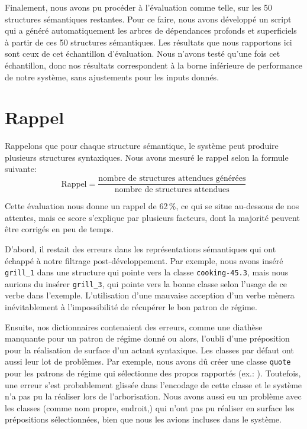 Finalement, nous avons pu procéder à l'évaluation comme telle, sur les 50 structures sémantiques restantes. Pour ce faire, nous avons développé un script qui a généré automatiquement les arbres de dépendances profonds et superficiels à partir de ces 50 structures sémantiques. Les résultats que nous rapportons ici sont ceux de cet échantillon d'évaluation. Nous n'avons testé qu'une fois cet échantillon, donc nos résultats correspondent à la borne inférieure de performance de notre système, sans ajustements pour les inputs donnés.
                              
\section{Rappel}

Rappelons que pour chaque structure sémantique, le système peut produire plusieurs structures syntaxiques. Nous avons mesuré le rappel selon la formule suivante:
\[\text{Rappel} = \frac{\text{nombre de structures attendues générées}}{\text{nombre de structures attendues}}\]

Cette évaluation nous donne un rappel de 62\,\%, ce qui se situe au-dessous de nos attentes, mais ce score s'explique par plusieurs facteurs, dont la majorité peuvent être corrigés en peu de temps. 

D'abord, il restait des erreurs dans les représentations sémantiques qui ont échappé à notre filtrage post-développement. Par exemple, nous avons inséré \texttt{grill\_1} dans une structure qui pointe vers la classe \texttt{cooking-45.3}, mais nous aurions du insérer \texttt{grill\_3}, qui pointe vers la bonne classe selon l'usage de ce verbe dans l'exemple. L'utilisation d'une mauvaise acception d'un verbe mènera inévitablement à l'impossibilité de récupérer le bon patron de régime.

Ensuite, nos dictionnaires contenaient des erreurs, comme une diathèse manquante pour un patron de régime donné ou alors, l'oubli d'une préposition pour la réalisation de surface d'un actant syntaxique. Les classes par défaut ont aussi leur lot de problèmes. Par exemple, nous avons dû créer une classe \texttt{quote} pour les patrons de régime qui sélectionne des propos rapportés (ex.: ). Toutefois, une erreur s'est probablement glissée dans l'encodage de cette classe et le système n'a pas pu la réaliser lors de l'arborisation. Nous avons aussi eu un problème avec les classes (comme nom propre, endroit,) qui n'ont pas pu réaliser en surface les prépositions sélectionnées, bien que nous les avions incluses dans le système.

